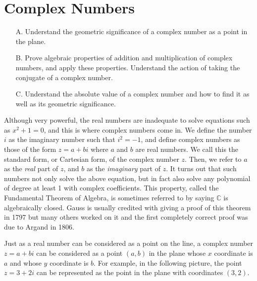 \section{Complex Numbers}

\begin{outcome}
\begin{enumerate}
\item[A.]  Understand the geometric significance of a complex number as a point
in the plane.

\item[B.]  Prove algebraic properties of addition and multiplication of complex numbers, and 
apply these properties. Understand the action of taking the conjugate of a complex number.

\item[C.]  Understand the absolute value of a complex number and how to find it
as well as its geometric significance.
\end{enumerate}
\end{outcome}

Although very powerful, the real numbers are inadequate to solve
equations such as $x^2+1=0$, and this is where complex numbers come
in. We define the number $i$ as the imaginary number such that $i^2 =
-1$, and define complex numbers as those of the form $z = a + bi$
where $a$ and $b$ are real numbers. We call this the standard form, or Cartesian form, of the complex number
$z$.
Then, we refer to $a$ as the
{\em real\em} part of $z$, and $b$ as the {\em imaginary\em} part of
$z$. It turns out that such numbers not only solve the above equation,
but in fact also solve any polynomial of degree at least 1 with complex coefficients. This property, called the Fundamental Theorem of Algebra, is sometimes referred to by saying $\mathbb{C}$ is
algebraically closed. Gauss is usually credited with giving a proof
of this theorem in 1797 but many others worked on it and the first
completely correct proof was due to Argand in 1806.

Just as a real number can be considered as a point on the line, a
complex number $z = a + bi$ can be considered as a point $\left(
a,b\right) $ in the plane whose $x$ coordinate is $ a$ and whose $y$
coordinate is $b.$ For example, in the following picture, the point $z
= 3+2i$ can be represented as the point in the plane with
coordinates $\left( 3,2\right) .$

\begin{center}
\end{center}

